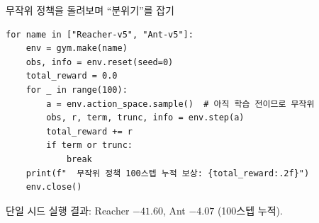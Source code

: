 \begin{frame}[fragile]{무작위 정책을 돌려보며 ``분위기''를 잡기}
\begin{lstlisting}
for name in ["Reacher-v5", "Ant-v5"]:
    env = gym.make(name)
    obs, info = env.reset(seed=0)
    total_reward = 0.0
    for _ in range(100):
        a = env.action_space.sample()  # 아직 학습 전이므로 무작위
        obs, r, term, trunc, info = env.step(a)
        total_reward += r
        if term or trunc:
            break
    print(f"  무작위 정책 100스텝 누적 보상: {total_reward:.2f}")
    env.close()
\end{lstlisting}
  {\footnotesize 단일 시드 실행 결과: Reacher $-41.60$, Ant $-4.07$ (100스텝
  누적).}
\end{frame}
